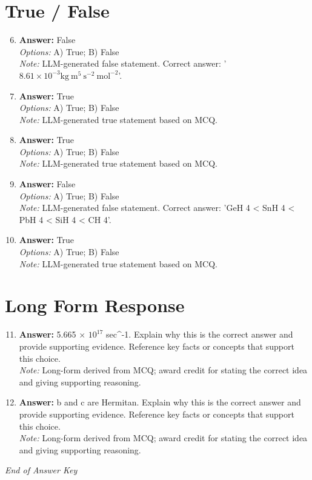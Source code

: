 \documentclass[12pt]{article}
\begin{document}
\section*{True / False}
\begin{enumerate}[label=\arabic*.]
\setcounter{enumi}{5}
\item \textbf{Answer:} False
\\ \textit{Options:} A) True; B) False
\\ \textit{Note:} LLM-generated false statement. Correct answer: '$8.61 \times 10^{-3} \mathrm{kg} \mathrm{~m}^5 \mathrm{~s}^{-2} \mathrm{~mol}^{-2}$'.
\item \textbf{Answer:} True
\\ \textit{Options:} A) True; B) False
\\ \textit{Note:} LLM-generated true statement based on MCQ.
\item \textbf{Answer:} True
\\ \textit{Options:} A) True; B) False
\\ \textit{Note:} LLM-generated true statement based on MCQ.
\item \textbf{Answer:} False
\\ \textit{Options:} A) True; B) False
\\ \textit{Note:} LLM-generated false statement. Correct answer: 'GeH 4 \textless{} SnH 4 \textless{} PbH 4 \textless{} SiH 4 \textless{} CH 4'.
\item \textbf{Answer:} True
\\ \textit{Options:} A) True; B) False
\\ \textit{Note:} LLM-generated true statement based on MCQ.
\end{enumerate}

\section*{Long Form Response}
\begin{enumerate}[label=\arabic*.]
\setcounter{enumi}{10}
\item \textbf{Answer:} 5.665 \ensuremath{\times} $10^17$ sec^-1. Explain why this is the correct answer and provide supporting evidence. Reference key facts or concepts that support this choice.
\\ \textit{Note:} Long-form derived from MCQ; award credit for stating the correct idea and giving supporting reasoning.
\item \textbf{Answer:} b and c are Hermitan. Explain why this is the correct answer and provide supporting evidence. Reference key facts or concepts that support this choice.
\\ \textit{Note:} Long-form derived from MCQ; award credit for stating the correct idea and giving supporting reasoning.
\end{enumerate}

\vfill
\noindent\textit{End of Answer Key}
\end{document}
